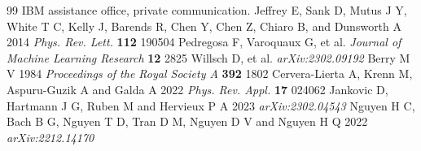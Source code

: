 \documentclass[12pt]{iopart}
\begin{document}
\begin{thebibliography}{99}
%
 IBM assistance office, private communication. 
%
 Jeffrey E, Sank D, Mutus J Y, White T C, Kelly J, Barends R, Chen Y, Chen Z, Chiaro B, and Dunsworth A 2014 \emph{Phys. Rev. Lett.} \textbf{112} 190504
%
Pedregosa F, Varoquaux G, et al. %
\emph{Journal of Machine Learning Research} \textbf{12} 2825
%
 Willsch D, et al. %
\emph{arXiv:2302.09192}
%
 Berry M V 1984 \emph{Proceedings of the Royal Society A} \textbf{392} 1802
%
 Cervera-Lierta A, Krenn M, Aspuru-Guzik A and Galda A 2022 \emph{Phys. Rev. Appl.} \textbf{17} 024062
%
 Jankovic D, Hartmann J G, Ruben M and Hervieux P A 2023 \emph{arXiv:2302.04543}
%
 Nguyen H C, Bach B G, Nguyen T D, Tran D M, Nguyen D V and Nguyen H Q 2022 \emph{arXiv:2212.14170}

\end{thebibliography}

\end{document}
